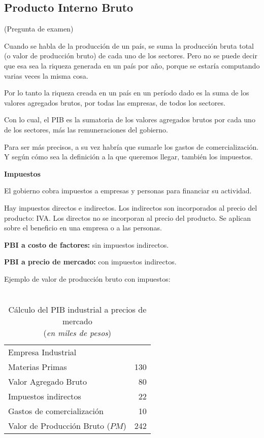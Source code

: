 \subsection{Producto Interno Bruto}

(Pregunta de examen)

Cuando se habla de la producción de un país,
se suma la producción bruta total (o valor de producción bruto)
de cada uno de los sectores.
Pero no se puede decir que esa sea la riqueza generada en un país por año,
porque se estaría computando varias veces la misma cosa.

Por lo tanto la riqueza creada en un país en un período dado es la suma de los
valores agregados brutos, por todas las empresas, de todos los sectores.

Con lo cual,
el PIB es la sumatoria de los valores agregados brutos
por cada uno de los sectores,
más las remuneraciones del gobierno.

Para ser más precisos,
a su vez habría que sumarle los gastos de comercialización.
Y según cómo sea la definición a la que queremos llegar,
también los impuestos.

\textbf{Impuestos}

El gobierno cobra impuestos a empresas y personas para financiar su actividad.

Hay impuestos directos e indirectos.
Los indirectos son incorporados al precio del producto: IVA.
Los directos no se incorporan al precio del producto.
Se aplican sobre el beneficio en una empresa o a las personas.

\textbf{PBI a costo de factores:} sin impuestos indirectos.

\textbf{PBI a precio de mercado:} con impuestos indirectos.

Ejemplo de valor de producción bruto con impuestos:

\vspace{.5cm}
\begin{table}[H]
    \centering
    \caption{\\Cálculo del PIB industrial a precios de mercado\\
        (\textit{en miles de pesos})}
    \vspace{.5cm}
    \begin{tabular}{lr}
        \hline
        Empresa Industrial                 &     \\
        Materias Primas                    & 130 \\
        Valor Agregado Bruto               & 80  \\
        Impuestos indirectos               & 22  \\
        Gastos de comercialización         & 10  \\
        \hline
        Valor de Producción Bruto (\(PM\)) & 242 \\
    \end{tabular}
\end{table}
\vspace{.5cm}

